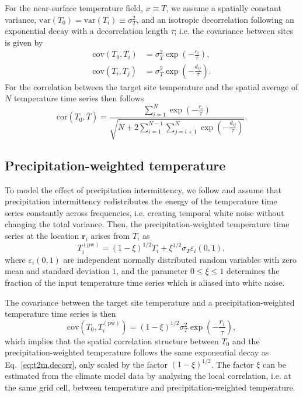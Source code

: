 \documentclass[cp, manuscript, draft]{copernicus}
\begin{document}
For the near-surface temperature field, $x \equiv T$, we assume a spatially
constant variance, $\mathrm{var}(T_0)=\mathrm{var}(T_i)\equiv\sigma_T^2$, and an
isotropic decorrelation following an exponential decay with a decorrelation
length $\tau$; i.e. the covariance between sites is given by
%
\begin{align}
\label{eq:t2m.decorr}
\mathrm{cov}(T_0,T_i)&=\sigma_T^2\exp{\left(-\frac{r_i}{\tau}\right)},\\
\mathrm{cov}(T_i,T_j)&=\sigma_T^2\exp{\left(-\frac{d_{ij}}{\tau}\right)}.
\end{align}
%
For the correlation between the target site temperature and the spatial average
of $N$ temperature time series then follows
%
\begin{equation}
\label{eq:t2m.corr}
\mathrm{cor}(T_0,\overline{T})=
\frac{\sum_{i=1}^{N}\exp{\left(-\frac{r_i}{\tau}\right)}}
{\sqrt{N+2\sum_{i=1}^{N-1}
\sum_{j=i+1}^{N}{\exp{\left(-\frac{d_{ij}}{\tau}\right)}}}}.
\end{equation}

\subsection{Precipitation-weighted temperature}
\label{app:concept.model.t2m.pw}

To model the effect of precipitation intermittency, we follow
\citet{Laepple2018} and assume that precipitation intermittency redistributes
the energy of the temperature time series constantly across frequencies,
i.e. creating temporal white noise without changing the total variance. Then,
the precipitation-weighted temperature time series at the location
$\mathbf{r}_i$ arises from $T_i$ as
%
\begin{equation}
\label{eq:precip.weighting}
T_i^{\mathrm{(pw)}}=
\left(1-\xi\right)^{1/2}T_i + \xi^{1/2} \sigma_T \varepsilon_i(0,1),
\end{equation}
%
where $\varepsilon_i(0,1)$ are independent normally distributed random variables
with zero mean and standard deviation $1$, and the parameter $0\leq\xi\leq1$
determines the fraction of the input temperature time series which is aliased
into white noise.

The covariance between the target site temperature and a precipitation-weighted
temperature time series is then
\begin{equation}
\label{eq:t2m.pw.decorr}
\mathrm{cov}(T_0,T_i^{\mathrm{(pw)}})=
(1-\xi)^{1/2}\sigma_T^2\exp{\left(-\frac{r_i}{\tau}\right)},
\end{equation}
%
which implies that the spatial correlation structure between $T_0$ and the
precipitation-weighted temperature follows the same exponential decay as
Eq.~\eqref{eq:t2m.decorr}, only scaled by the factor $(1-\xi)^{1/2}$. The factor
$\xi$ can be estimated from the climate model data by analysing the local
correlation, i.e. at the same grid cell, between temperature and
precipitation-weighted temperature.
\end{document}
